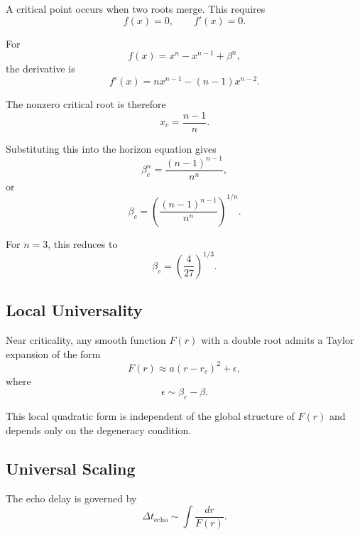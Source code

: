 \documentclass[11pt,a4paper]{article}
\begin{document}
A critical point occurs when two roots merge. This requires
\begin{equation}
f(x)=0,
\qquad
f'(x)=0 .
\end{equation}

For
\begin{equation}
f(x)=x^n-x^{n-1}+\beta^n ,
\end{equation}
the derivative is
\begin{equation}
f'(x)
=
n x^{n-1}
-
(n-1)x^{n-2}.
\end{equation}

The nonzero critical root is therefore
\begin{equation}
x_c = \frac{n-1}{n}.
\end{equation}

Substituting this into the horizon equation gives
\begin{equation}
\beta_c^n
=
\frac{(n-1)^{n-1}}{n^n},
\end{equation}
or
\begin{equation}
\beta_c
=
\left(
\frac{(n-1)^{n-1}}{n^n}
\right)^{1/n}.
\end{equation}

For $n=3$, this reduces to
\begin{equation}
\beta_c =
\left(
\frac{4}{27}
\right)^{1/3}.
\end{equation}

\subsection{Local Universality}

Near criticality, any smooth function $F(r)$ with a double root admits a Taylor expansion of the form
\begin{equation}
F(r)
\approx
 a(r-r_c)^2 + \epsilon ,
\end{equation}
where
\begin{equation}
\epsilon \sim \beta_c-\beta .
\end{equation}

This local quadratic form is independent of the global structure of $F(r)$ and depends only on the degeneracy condition.

\subsection{Universal Scaling}

The echo delay is governed by
\begin{equation}
\Delta t_{\mathrm{echo}}
\sim
\int
\frac{dr}{F(r)} .
\end{equation}
\end{document}

